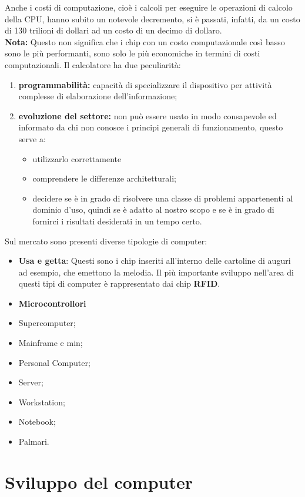 \documentclass[12pt]{report}
\begin{document}
		Anche i costi di computazione, cioè i calcoli per eseguire le operazioni di calcolo della CPU, hanno subito un notevole decremento, si è passati, infatti, da un costo di 130 trilioni di dollari ad un costo di un decimo di dollaro.
		\\
		\textbf{Nota: }Questo non significa che i chip con un costo computazionale così basso sono le più performanti, sono solo le più economiche in termini di costi computazionali.
		Il calcolatore ha due peculiarità:
		\begin{enumerate}
			\item \textbf{programmabilità: }capacità di specializzare il dispositivo per attività complesse di elaborazione dell'informazione;
			\item \textbf{evoluzione del settore: }non può essere usato in modo consapevole ed informato da chi non conosce i principi generali di funzionamento, questo serve a:
			\begin{itemize}
				\item utilizzarlo correttamente
				\item comprendere le differenze architetturali;
				\item decidere se è in grado di risolvere una classe di problemi appartenenti al dominio d'uso, quindi se è adatto al nostro scopo e se è in grado di fornirci i risultati desiderati in un tempo certo.
			\end{itemize}
		\end{enumerate}
		Sul mercato sono presenti diverse tipologie di computer:
		\begin{itemize}
			\item \textbf{Usa e getta}: Questi sono i chip inseriti all'interno delle cartoline di auguri ad esempio, che emettono la melodia. Il più importante sviluppo nell'area di questi tipi di computer è rappresentato dai chip \textbf{RFID}.
			\item \textbf{Microcontrollori}
			\item Supercomputer;
			\item Mainframe e min;
			\item Personal Computer;
			\item Server;
			\item Workstation;
			\item Notebook;
			\item Palmari.
		\end{itemize}
		\section{Sviluppo del computer}
\end{document}
